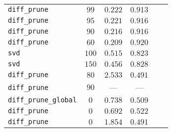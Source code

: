 \begin{table}[tbh]
\begin{tabular}{lccccc}
\texttt{diff\_prune}         &      $99$\textsuperscript{} &   $0.222$\textsuperscript{} &   $0.913$\textsuperscript{} \\
\texttt{diff\_prune}         &      $95$\textsuperscript{} &   $0.221$\textsuperscript{} &   $0.916$\textsuperscript{} \\
\texttt{diff\_prune}         &      $90$\textsuperscript{} &   $0.216$\textsuperscript{} &   $0.916$\textsuperscript{} \\
\texttt{diff\_prune}         &      $60$\textsuperscript{} &   $0.209$\textsuperscript{} &   $0.920$\textsuperscript{} \\
\texttt{svd}                 &     $100$\textsuperscript{} &   $0.515$\textsuperscript{} &   $0.823$\textsuperscript{} \\
\texttt{svd}                 &     $150$\textsuperscript{} &   $0.456$\textsuperscript{} &   $0.828$\textsuperscript{} \\
\texttt{diff\_prune}         &      $80$\textsuperscript{} &   $2.533$\textsuperscript{} &   $0.491$\textsuperscript{} \\
\texttt{diff\_prune}         &      $90$\textsuperscript{} &                         --- &                         --- \\
\texttt{diff\_prune\_global} &       $0$\textsuperscript{} &   $0.738$\textsuperscript{} &   $0.509$\textsuperscript{} \\
\texttt{diff\_prune}         &       $0$\textsuperscript{} &   $0.692$\textsuperscript{} &   $0.522$\textsuperscript{} \\
\texttt{diff\_prune}         &       $0$\textsuperscript{} &   $1.854$\textsuperscript{} &   $0.491$\textsuperscript{} \\
\bottomrule
\end{tabular}

        \end{table}